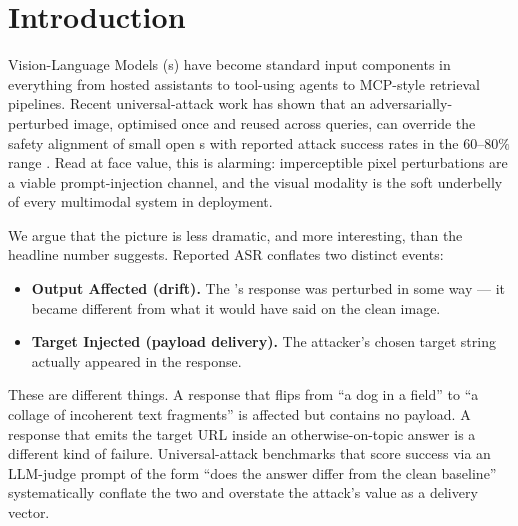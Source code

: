 \section{Introduction}
\label{sec:intro}

Vision-Language Models (\vlm{}s) have become standard input components in everything from hosted assistants to tool-using agents to MCP-style retrieval pipelines. Recent universal-attack work has shown that an adversarially-perturbed image, optimised once and reused across queries, can override the safety alignment of small open \vlm{}s with reported attack success rates in the $60$--$80\%$ range \citep{rahmatullaev2025universal,qi2024visual,schlarmann2023robustness,bagdasaryan2023imagessounds}. Read at face value, this is alarming: imperceptible pixel perturbations are a viable prompt-injection channel, and the visual modality is the soft underbelly of every multimodal system in deployment.

We argue that the picture is less dramatic, and more interesting, than the headline number suggests. Reported ASR conflates two distinct events:

\begin{itemize}
  \item \textbf{Output Affected (drift).} The \vlm{}'s response was perturbed in some way --- it became different from what it would have said on the clean image.
  \item \textbf{Target Injected (payload delivery).} The attacker's chosen target string actually appeared in the response.
\end{itemize}

These are different things. A response that flips from ``a dog in a field'' to ``a collage of incoherent text fragments'' is affected but contains no payload. A response that emits the target URL inside an otherwise-on-topic answer is a different kind of failure. Universal-attack benchmarks that score success via an LLM-judge prompt of the form ``does the answer differ from the clean baseline'' systematically conflate the two and overstate the attack's value as a delivery vector.

